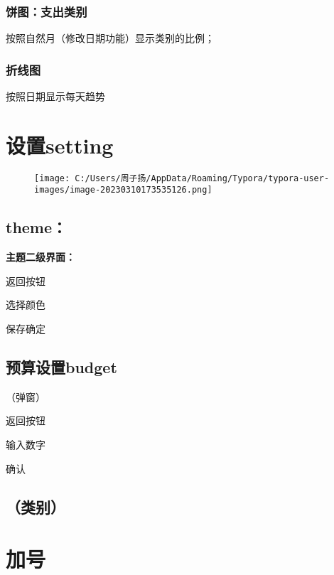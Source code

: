 \documentclass[
]{article}
\begin{document}
\hypertarget{ux997cux56feux652fux51faux7c7bux522b}{%
\subsubsection{饼图：支出类别}\label{ux997cux56feux652fux51faux7c7bux522b}}

按照自然月（修改日期功能）显示类别的比例；

\hypertarget{ux6298ux7ebfux56fe}{%
\subsubsection{折线图}\label{ux6298ux7ebfux56fe}}

按照日期显示每天趋势

\hypertarget{ux8bbeux7f6esetting}{%
\section{设置setting}\label{ux8bbeux7f6esetting}}

\begin{figure}
\centering
\texttt{[image: C:/Users/周子扬/AppData/Roaming/Typora/typora-user-images/image-20230310173535126.png]}
\caption{}
\end{figure}

\hypertarget{theme}{%
\subsection{theme：}\label{theme}}

\textbf{主题二级界面：}

返回按钮

选择颜色

保存确定

\hypertarget{ux9884ux7b97ux8bbeux7f6ebudget}{%
\subsection{预算设置budget}\label{ux9884ux7b97ux8bbeux7f6ebudget}}

（弹窗）

返回按钮

输入数字

确认

\hypertarget{ux7c7bux522buxff09}{%
\subsection{（类别）}\label{ux7c7bux522buxff09}}

\hypertarget{ux52a0ux53f7}{%
\section{加号}\label{ux52a0ux53f7}}
\end{document}
